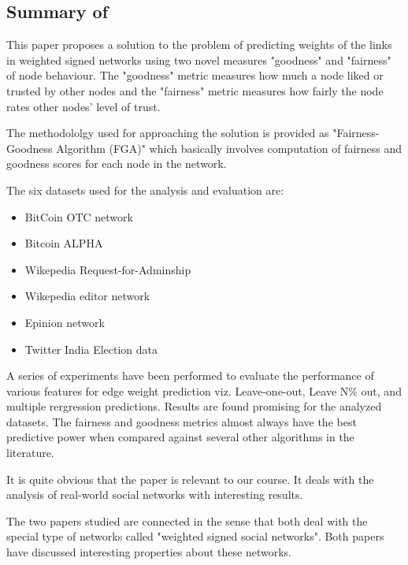\subsection{Summary of \cite{kumar2016edge}}
This paper proposes a solution to the problem of predicting weights of the links in weighted signed networks using two novel measures "goodness" and "fairness" of node behaviour. The "goodness" metric measures how much a node liked or trusted by other nodes and the "fairness" metric measures how fairly the node rates other nodes' level of trust. 

The methodololgy used for approaching the solution is provided as "Fairness-Goodness Algorithm (FGA)" which basically involves computation of fairness and goodness scores for each node in the network. 

The six datasets used for the analysis and evaluation are:
\begin{itemize}
	\denseitems
	\item 
	BitCoin OTC network
	\item
	Bitcoin ALPHA
	\item
	Wikepedia Request-for-Adminship
	\item
	Wikepedia editor network
	\item
	Epinion network
	\item
	Twitter India Election data
\end{itemize}	
A series of experiments have been performed to evaluate the performance of various features for edge weight prediction viz. Leave-one-out, Leave N\% out, and multiple rergression predictions. Results are found promising for the analyzed datasets. The fairness and goodness metrics almost always have the best predictive power when compared against several other algorithms in the literature.

It is quite obvious that the paper is relevant to our course. It deals with the analysis of real-world social networks with interesting results.

The two papers studied are connected in the sense that both deal with the special type of networks called "weighted signed social networks". Both papers have discussed interesting properties about these networks. 